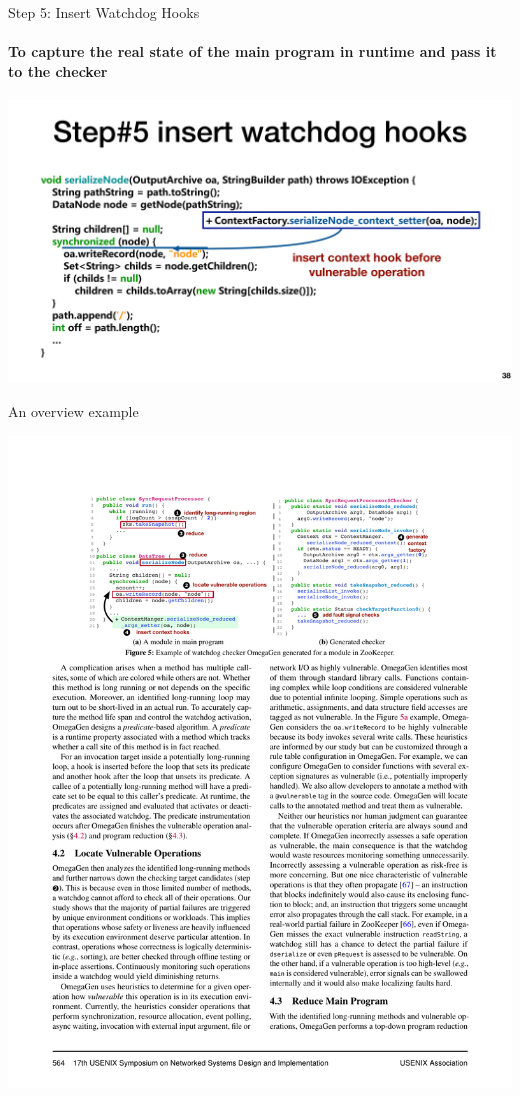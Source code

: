 \documentclass[aspectratio=169]{beamer}
\begin{document}
\begin{frame}{Step 5: Insert Watchdog Hooks}
\framesubtitle{To capture the real state of the main program in runtime and pass it to the checker}
    \begin{center}
        \includegraphics[width=.95\textwidth]{fig/hook}
    \end{center}
\end{frame}

\begin{frame}{An overview example}
    \begin{center}
        \includegraphics[width=\textwidth]{fig/compare}
    \end{center}
\end{frame}
\end{document}
